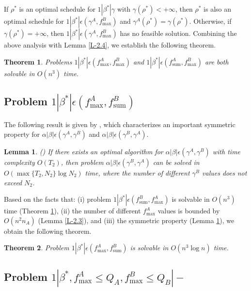 \documentclass[12pt]{article}
\newtheorem{theorem}{Theorem}[section]
\newtheorem{lemma}{Lemma}[section]
\begin{document}
\begin{sloppypar}
If $\rho^{*}$ is an optimal schedule for $1 | \beta^{*} | \gamma$ with $\gamma(\rho^{*})<+\infty$, then $\rho^{*}$ is also an optimal schedule for $1 |\beta^{*} |\epsilon(\gamma^A, f_{\max}^B)$ and $\gamma^A(\rho^{*})=\gamma(\rho^{*})$. Otherwise, if $\gamma(\rho^{*})=+\infty$, then $1 | \beta^{*} |\epsilon(\gamma^A, f_{\max}^B)$ has no feasible solution. Combining the above analysis with Lemma \ref{L-2.4}, we establish the following theorem. 

\begin{theorem} \label{T-3.1}
Problems $1|\beta^{*}|\epsilon(f_{\max}^A, f_{\max}^B)$ and
$1 | \beta^{*} |\epsilon(f_{\mathrm{sum}}^{A}, f_{\max}^B)$ are both solvable in $O(n^3)$ time.
\end{theorem}

\subsection{Problem $1 | \beta^{*} |\epsilon(f_{\max}^A, f_{\mathrm{sum}}^B)$}

The following result is given by \cite{OronShabtaySteiner2015EJOR}, which characterizes an important symmetric property for $\alpha| \beta | \epsilon(\gamma^A, \gamma^B)$ and $\alpha| \beta | \epsilon(\gamma^B, \gamma^A)$.

\begin{lemma} \label{L-3.1} (\citealp{OronShabtaySteiner2015EJOR})
If there exists an optimal algorithm for $\alpha| \beta | \epsilon(\gamma^A, \gamma^B)$ with time complexity $O(T_2)$, then problem $\alpha| \beta | \epsilon(\gamma^B, \gamma^A)$ can be solved in
$O(\max\{T_2,  N_2\} \log N_2)$ time, where the number of different $\gamma^B$ values does not exceed $N_2$.
\end{lemma}

Based on the facts that: (i) problem $1 | \beta^{*} |\epsilon(f_{\mathrm{sum}}^{B}, f_{\max}^A)$
is solvable in $O(n^3)$ time (Theorem \ref{T-3.1}), (ii) the number of different $f_{\max}^A$ values is bounded by $O(n^2 n_A)$ (Lemma \ref{L-2.3}), and (iii) the symmetric property (Lemma \ref{L-3.1}), we obtain the following theorem.

\begin{theorem} \label{T-3.2}
Problem $1 | \beta^{*} |\epsilon(f_{\max}^A, f_{\mathrm{sum}}^B)$ is solvable in $O(n^3 \log n)$ time.
\end{theorem}

\subsection{Problem $1 | \beta^{*}, f_{\max}^A \leq Q_A, f_{\max}^B \leq Q_B |-$}


\end{sloppypar}
\end{document}
